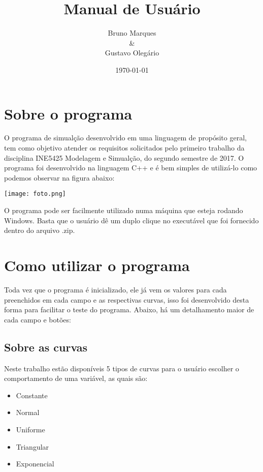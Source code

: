 \documentclass{article}
\title{Manual de Usuário}
\author{Bruno Marques \\ \& \\ Gustavo Olegário}
\date{\today}
\begin{document}
    \begin{titlepage}
        \maketitle
        \thispagestyle{empty}
    \end{titlepage}
    
    \tableofcontents
    \clearpage
    \section{Sobre o programa}
        O programa de simualção desenvolvido em uma linguagem de propósito geral,
        tem como objetivo atender os requisitos solicitados pelo primeiro trabalho
        da disciplina INE5425 Modelagem e Simualção, do segundo semestre de 2017.
        O programa foi desenvolvido na linguagem C++ e é bem simples de utilizá-lo
        como podemos observar na figura abaixo:
        
        \begin{center}
          \texttt{[image: foto.png]}
        \end{center}
        
        O programa pode ser facilmente utilizado numa máquina que esteja rodando
        Windows. Basta que o usuário dê um duplo clique no executável que foi
        fornecido dentro do arquivo .zip.
    
    \section{Como utilizar o programa}
        Toda vez que o programa é inicializado, ele já vem os valores para cada
        preenchidos em cada campo e as respectivas curvas, isso foi desenvolvido
        desta forma para facilitar o teste do programa. Abaixo, há um detalhamento
        maior de cada campo e botões:
        
        \subsection{Sobre as curvas}
            Neste trabalho estão disponíveis 5 tipos de curvas para o usuário escolher o comportamento de uma variável, as quais são:
            \begin{itemize}
                \item Constante
                \item Normal
                \item Uniforme
                \item Triangular
                \item Exponencial
            \end{itemize}
            
\end{document}
